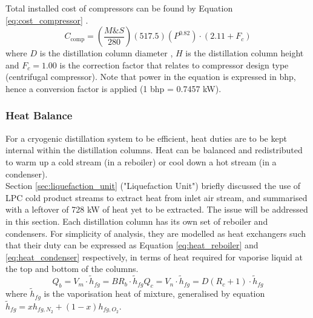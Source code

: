 	\noindent Total installed cost of compressors can be found by Equation \ref{eq:cost_compressor} \citep{douglas1988}. 
	\begin{equation}
	    C_{\text{comp}} = \left(\frac{M\&S}{280}\right)\left(517.5\right)\left(P^{0.82}\right)\cdot \left(2.11 + F_c\right)
	    \label{eq:cost_compressor}
	\end{equation}
	where $D$ is the distillation column diameter , $H$ is the distillation column height and $F_c = 1.00$ is the correction factor that relates to compressor design type (centrifugal compressor). Note that power in the equation is expressed in bhp, hence a conversion factor is applied (1 bhp = 0.7457 kW).
	\subsubsection{Heat Balance} \noindent \noindent
    For a cryogenic distillation system to be efficient, heat duties are to be kept internal within the distillation columns. Heat can be balanced and redistributed to warm up a cold stream (in a reboiler) or cool down a hot stream (in a condenser). \\ 
    Section \ref{sec:liquefaction_unit} ("Liquefaction Unit") briefly discussed the use of LPC cold product streams to extract heat from inlet air stream, and summarised with a leftover of 728 kW of heat yet to be extracted. The issue will be addressed in this section.
        Each distillation column has its own set of reboiler and condensers. For simplicity of analysis, they are modelled as heat exchangers such that their duty can be expressed as Equation \ref{eq:heat_reboiler} and \ref{eq:heat_condenser} respectively, in terms of heat required for vaporise liquid at the top and bottom of the columns.
        \begin{subequations}
            \begin{equation}
                Q_{b} = V_m \cdot \tilde{h}_{fg} = BR_b \cdot \tilde{h}_{fg}
                \label{eq:heat_reboiler}
            \end{equation}
            \begin{equation}
                Q_{c} = V_n \cdot \tilde{h}_{fg} = D(R_c+1) \cdot \tilde{h}_{fg}
                \label{eq:heat_condenser}
            \end{equation}
		\end{subequations}
		where $\tilde{h}_{fg}$ is the vaporisation heat of mixture, generalised by equation $\tilde{h}_{fg} = xh_{fg,N_2} + (1-x)h_{fg,O_2}$. \\
		
